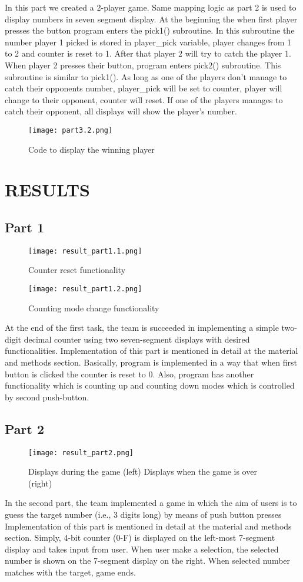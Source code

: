 \documentclass[pdftex,12pt,a4paper]{article}
\begin{document}
In this part we created a 2-player game. Same mapping logic as part 2 is used to display numbers in seven segment display. At the beginning the when first player presses the button program enters the pick1() subroutine. In this subroutine the number player 1 picked is stored in player\_pick variable, player changes from 1 to 2 and counter is reset to 1. After that player 2 will try to catch the player 1. When player 2 presses their button, program enters pick2() subroutine. This subroutine is similar to pick1(). As long as one of the players don't manage to catch their opponents number, player\_pick will be set to counter, player will change to their opponent, counter will reset. If one of the players manages to catch their opponent, all displays will show the player's number.

\begin{figure}[ht]
	\centering
	\texttt{[image: part3.2.png]}	
	\caption{Code to display the winning player}
	\label{fig5}
\end{figure}
\newpage
\section{RESULTS}
\subsection{Part 1}
\begin{figure}[ht]
	\centering
	\texttt{[image: result\_part1.1.png]}	
	\caption{Counter reset functionality}
	\label{fig6}
\end{figure}
\begin{figure}[ht]
	\centering
	\texttt{[image: result\_part1.2.png]}	
	\caption{Counting mode change functionality}
	\label{fig7}
\end{figure}
At the end of the first task, the team is succeeded in implementing a simple two-digit decimal counter using two seven-segment displays with desired functionalities. Implementation of this part is mentioned in detail at the material and methods section. Basically, program is implemented in a way that when first button is clicked the counter is reset to 0. Also, program has another functionality which is counting up and counting down modes which is controlled by second push-button. 
\subsection{Part 2}
\begin{figure}[ht]
	\centering
	\texttt{[image: result\_part2.png]}	
	\caption{Displays during the game (left) Displays when the game is over (right)}
	\label{fig8}
\end{figure}
In the second part, the team implemented a game in which the aim of users is to guess the target number (i.e., 3 digits long) by means of push button presses Implementation of this part is mentioned in detail at the material and methods section. Simply, 4-bit counter (0-F) is displayed on the left-most 7-segment display and takes input from user. When user make a selection, the selected number is shown on the 7-segment display on the right. When selected number matches with the target, game ends.
\end{document}
